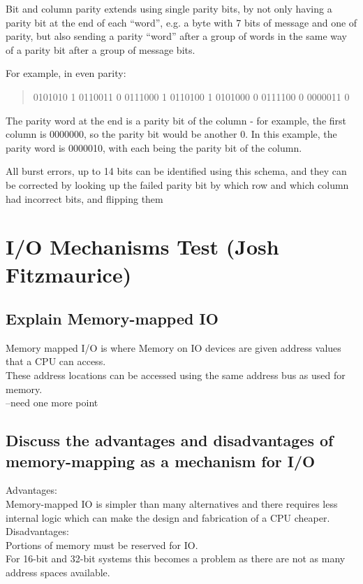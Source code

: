 \documentclass{article}
\begin{document}
Bit and column parity extends using single parity bits, by not only
having a parity bit at the end of each ``word'', e.g. a byte with 7 bits
of message and one of parity, but also sending a parity ``word'' after a
group of words in the same way of a parity bit after a group of message
bits.

For example, in even parity:

\begin{quote}
0101010 1
0110011 0
0111000 1
0110100 1
0101000 0
0111100 0
0000011 0
\end{quote}

The parity word at the end is a parity bit of the column - for example,
the first column is 0000000, so the parity bit would be another 0. In
this example, the parity word is 0000010, with each being the parity bit
of the column.

All burst errors, up to 14 bits can be identified using this schema, and
they can be corrected by looking up the failed parity bit by which row
and which column had incorrect bits, and flipping them











\newpage
\section{I/O Mechanisms Test (Josh Fitzmaurice)}
\subsection{Explain Memory-mapped IO}
Memory mapped I/O is where Memory on IO devices are given address values that a CPU can access.\\
These address locations can be accessed using the same address bus as used for memory.\\
--need one more point

\subsection{Discuss the advantages and disadvantages of memory-mapping as a mechanism for I/O}
Advantages:\\
Memory-mapped IO is simpler than many alternatives and there requires less internal logic which can make the design and fabrication of a CPU cheaper.\\
Disadvantages:\\
Portions of memory must be reserved for IO.\\
For 16-bit and 32-bit systems this becomes a problem as there are not as many address spaces available.
\end{document}
